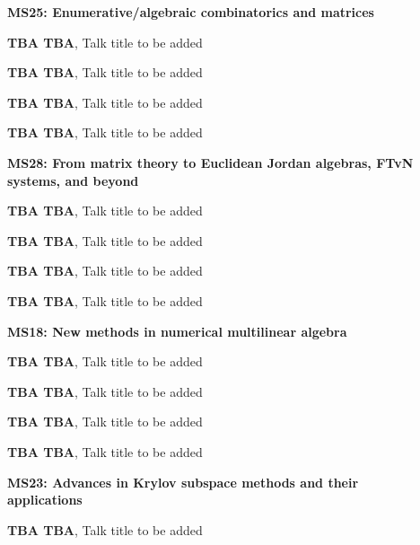 \documentclass[ILAS2025-program.tex]{subfiles}
\begin{document}
\begin{description}
\begin{description}
        \end{description}
    \begin{description}
    \item[] \textbf{MS25: Enumerative/algebraic combinatorics and matrices} 
    \item[] \textbf{TBA TBA}, Talk title to be added
        \item[] \textbf{TBA TBA}, Talk title to be added
        \item[] \textbf{TBA TBA}, Talk title to be added
        \item[] \textbf{TBA TBA}, Talk title to be added
        \end{description}
    \begin{description}
    \item[] \textbf{MS28: From matrix theory to Euclidean Jordan algebras, FTvN systems, and beyond} 
    \item[] \textbf{TBA TBA}, Talk title to be added
        \item[] \textbf{TBA TBA}, Talk title to be added
        \item[] \textbf{TBA TBA}, Talk title to be added
        \item[] \textbf{TBA TBA}, Talk title to be added
        \end{description}
    \begin{description}
    \item[] \textbf{MS18: New methods in numerical multilinear algebra} 
    \item[] \textbf{TBA TBA}, Talk title to be added
        \item[] \textbf{TBA TBA}, Talk title to be added
        \item[] \textbf{TBA TBA}, Talk title to be added
        \item[] \textbf{TBA TBA}, Talk title to be added
        \end{description}
    \begin{description}
    \item[] \textbf{MS23: Advances in Krylov subspace methods and their applications} 
    \item[] \textbf{TBA TBA}, Talk title to be added

\end{description}
\end{description}
\end{document}
